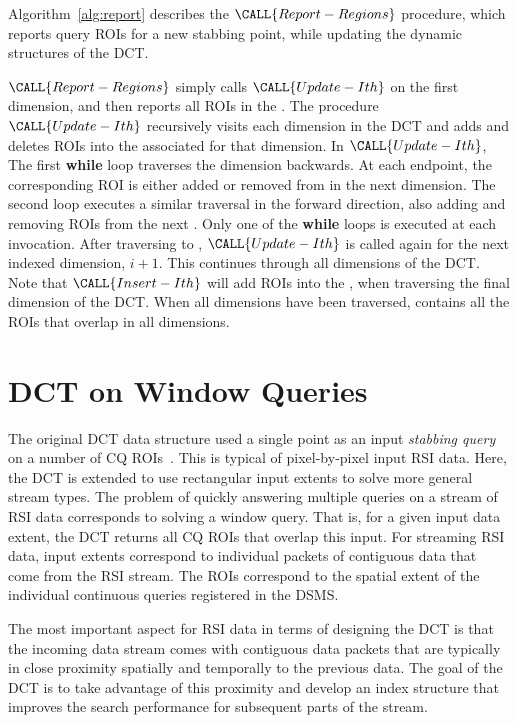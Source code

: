 \documentclass{ucdthesis}       %
\newcommand{\proc}[1]{\ensuremath{\CALL{#1}}}
\begin{document}
Algorithm~\ref{alg:report} describes the \proc{Report-Regions}
procedure, which reports query \acp{ROI} for a new stabbing point,
while updating the dynamic structures of the \ac{DCT}.

\proc{Report-Regions} simply calls \proc{Update-Ith} on the first
dimension, and then reports all \acp{ROI} in the  .
The procedure \proc{Update-Ith} recursively visits each dimension in
the \ac{DCT} and adds and deletes \acp{ROI} into the associated
 for that dimension.  In \proc{Update-Ith}, The first
{\bf while} loop traverses the dimension backwards.  At each endpoint,
the corresponding \ac{ROI} is either added or removed from
 in the next dimension.  The second loop executes a
similar traversal in the forward direction, also adding and removing
\acp{ROI} from the next .  Only one of the {\bf while}
loops is executed at each invocation.  After traversing to \npi,
\proc{Update-Ith} is called again for the next indexed dimension,
$i+1$.  This continues through all dimensions of the \ac{DCT}.  Note
that \proc{Insert-Ith} will add \acp{ROI} into the  ,
when traversing the final dimension of the \ac{DCT}.  When all
dimensions have been traversed,  contains all the \acp{ROI} that
overlap \np in all dimensions.
%

\section{\ac{DCT} on Window Queries}
\label{sec:dct-win}

The original \ac{DCT} data structure used a single point as an input
\emph{stabbing query} on a number of \ac{CQ}
\acp{ROI}~\cite{hart04index-query}.  This is typical of pixel-by-pixel
input \ac{RSI} data.  Here, the \ac{DCT} is extended to use rectangular
input extents to solve more general stream types.  The problem of
quickly answering multiple queries on a stream of \ac{RSI} data
corresponds to solving a window query.  That is, for a given input
data extent, the \ac{DCT} returns all \ac{CQ} \acp{ROI} that overlap this
input.  For streaming \ac{RSI} data, input extents correspond to
individual packets of contiguous data that come from the \ac{RSI}
stream.  The \acp{ROI} correspond to the spatial extent of the
individual continuous queries registered in the \ac{DSMS}.

The most important aspect for \ac{RSI} data in terms of designing the
\ac{DCT} is that the incoming data stream comes with contiguous data
packets that are typically in close proximity spatially and temporally
to the previous data.  The goal of the \ac{DCT} is to take advantage of
this proximity and develop an index structure that improves the
search performance for subsequent parts of the stream.
\end{document}
